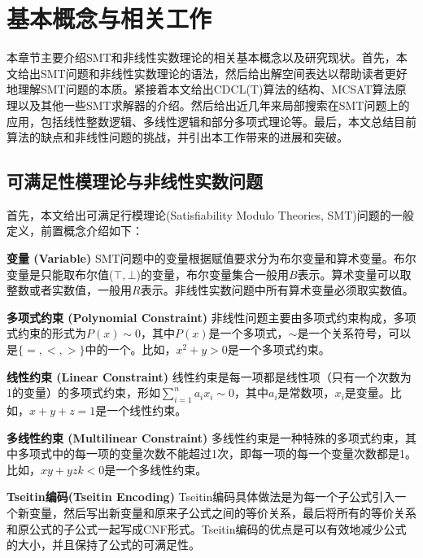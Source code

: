 \chapter{基本概念与相关工作}\label{chap:Relate}

本章节主要介绍SMT和非线性实数理论的相关基本概念以及研究现状。首先，本文给出SMT问题和非线性实数理论的语法，然后给出解空间表达以帮助读者更好地理解SMT问题的本质。紧接着本文给出CDCL(T)算法的结构、MCSAT算法原理以及其他一些SMT求解器的介绍。然后给出近几年来局部搜索在SMT问题上的应用，包括线性整数逻辑、多线性逻辑和部分多项式理论等。最后，本文总结目前算法的缺点和非线性问题的挑战，并引出本工作带来的进展和突破。

\section{可满足性模理论与非线性实数问题}
首先，本文给出可满足行模理论(Satisfiability Modulo Theories, SMT)问题的一般定义，前置概念介绍如下：

\begin{definition}{\textbf{变量 (Variable)}}
SMT问题中的变量根据赋值要求分为布尔变量和算术变量。布尔变量是只能取布尔值($\top, \bot$)的变量，布尔变量集合一般用$B$表示。算术变量可以取整数或者实数值，一般用$R$表示。非线性实数问题中所有算术变量必须取实数值。
\end{definition}

\begin{definition}{\textbf{多项式约束 (Polynomial Constraint)}}
非线性问题主要由多项式约束构成，多项式约束的形式为$P(x) \sim 0$，其中$P(x)$是一个多项式，$\sim$是一个关系符号，可以是$\{=, <, >\}$中的一个。比如，$x^2 + y > 0$是一个多项式约束。
\end{definition}

\begin{definition}{\textbf{线性约束 (Linear Constraint)}}
线性约束是每一项都是线性项（只有一个次数为1的变量）的多项式约束，形如$\sum_{i=1}^n a_i x_i \sim 0$，其中$a_i$是常数项，$x_i$是变量。比如，$x + y + z = 1$是一个线性约束。
\end{definition}

\begin{definition}{\textbf{多线性约束 (Multilinear Constraint)}}
多线性约束是一种特殊的多项式约束，其中多项式中的每一项的变量次数不能超过1次，即每一项的每一个变量次数都是1。比如，$x y + y z k < 0$是一个多线性约束。
\end{definition}

\begin{definition}{\textbf{Tseitin编码(Tseitin Encoding)}}
Tseitin编码具体做法是为每一个子公式引入一个新变量，然后写出新变量和原来子公式之间的等价关系，最后将所有的等价关系和原公式的子公式一起写成CNF形式。Tseitin编码的优点是可以有效地减少公式的大小，并且保持了公式的可满足性。
\end{definition}

